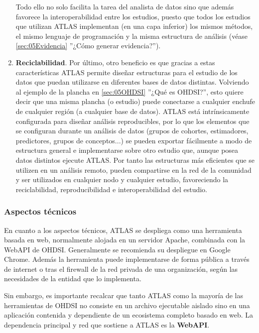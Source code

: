 \begin{enumerate}[label=\roman*.]
     Todo ello no solo facilita la tarea del analista de datos sino que además favorece la interoperabilidad entre los estudios, puesto que todos los estudios que utilizan ATLAS implementan (en una capa inferior) los mismos métodos, el mismo lenguaje de programación y la misma estructura de análisis (véase \ref{sec:05Evidencia} ''¿Cómo generar evidencia?''). 

     \item \textbf{Reciclabilidad}. Por último, otro beneficio es que gracias a estas características ATLAS permite diseñar estructuras para el estudio de los datos que puedan utilizarse en diferentes bases de datos distintas. Volviendo al ejemplo de la plancha en \ref{sec:05OHDSI} ''¿Qué es OHDSI?'', esto quiere decir que una misma plancha (o estudio) puede conectarse a cualquier enchufe de cualquier región (a cualquier base de datos). ATLAS está intrínsicamente configurada para diseñar análisis reproducibles, por lo que los elementos que se configuran durante un análisis de datos (grupos de cohortes, estimadores, predictores, grupos de conceptos...) se pueden exportar fácilmente a modo de estructura general e implementarse sobre otro estudio que, aunque posea datos distintos ejecute ATLAS. Por tanto las estructuras más eficientes que se utilizen en un análisis remoto, pueden compartirse en la red de la comunidad y ser utilizados en cualquier nodo y cualquier estudio, favoreciendo la reciclabilidad, reproducibilidad e interoperabilidad del estudio.
    
\end{enumerate}

\subsubsection{Aspectos técnicos}

En cuanto a los aspectos técnicos, ATLAS se despliega como una herramienta basada en web, normalmente alojada en un servidor Apache, combinada con la WebAPI de OHDSI. Generalmente se recomienda su despliegue en Google Chrome. Además la herramienta puede implementarse de forma pública a través de internet o tras el firewall de la red privada de una organización, según las necesidades de la entidad que lo implementa.

Sin embargo, es importante recalcar que tanto ATLAS como la mayoría de las herramientas de OHDSI no consiste en un archivo ejecutable aislado sino en una aplicación contenida y dependiente de un ecosistema completo basado en web. La dependencia principal y red que sostiene a ATLAS es la \textbf{WebAPI}.

